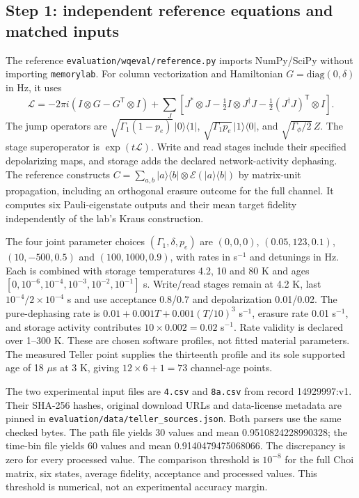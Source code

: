 \documentclass[10pt,a4paper]{article}
\newcommand{\code}[1]{\texttt{#1}}
\begin{document}
\subsection{Step 1: independent reference equations and matched inputs}
The reference \code{evaluation/wqeval/reference.py} imports NumPy/SciPy without importing \code{memorylab}. For column vectorization and Hamiltonian $G=\mathrm{diag}(0,\delta)$ in Hz, it uses
\[
\mathcal L=-2\pi i(I\otimes G-G^{\mathsf T}\otimes I)
+\sum_J\left[J^*\otimes J-\tfrac12 I\otimes J^\dagger J
-\tfrac12(J^\dagger J)^{\mathsf T}\otimes I\right].
\]
The jump operators are $\sqrt{\Gamma_1(1-p_e)}\,|0\rangle\langle1|$, $\sqrt{\Gamma_1p_e}\,|1\rangle\langle0|$, and $\sqrt{\Gamma_\phi/2}\,Z$. The stage superoperator is $\exp(t\mathcal L)$. Write and read stages include their specified depolarizing maps, and storage adds the declared network-activity dephasing. The reference constructs $C=\sum_{a,b}|a\rangle\langle b|\otimes\mathcal E(|a\rangle\langle b|)$ by matrix-unit propagation, including an orthogonal erasure outcome for the full channel. It computes six Pauli-eigenstate outputs and their mean target fidelity independently of the lab's Kraus construction.

The four joint parameter choices $(\Gamma_1,\delta,p_e)$ are $(0,0,0)$, $(0.05,123,0.1)$, $(10,-500,0.5)$ and $(100,1000,0.9)$, with rates in s$^{-1}$ and detunings in Hz. Each is combined with storage temperatures 4.2, 10 and 80 K and ages $[0,10^{-6},10^{-4},10^{-3},10^{-2},10^{-1}]$ s. Write/read stages remain at 4.2 K, last $10^{-4}/2\times10^{-4}$ s and use acceptance 0.8/0.7 and depolarization 0.01/0.02. The pure-dephasing rate is $0.01+0.001T+0.001(T/10)^3$ s$^{-1}$, erasure rate 0.01 s$^{-1}$, and storage activity contributes $10\times0.002=0.02$ s$^{-1}$. Rate validity is declared over 1--300 K. These are chosen software profiles, not fitted material parameters. The measured Teller point supplies the thirteenth profile and its sole supported age of 18 $\mu$s at 3 K, giving $12\times6+1=73$ channel-age points.

The two experimental input files are \code{4.csv} and \code{8a.csv} from record 14929997:v1. Their SHA-256 hashes, original download URLs and data-license metadata are pinned in \code{evaluation/data/teller\_sources.json}. Both parsers use the same checked bytes. The path file yields 30 values and mean 0.9510824228990328; the time-bin file yields 60 values and mean 0.9140479475068066. The discrepancy is zero for every processed value. The comparison threshold is $10^{-8}$ for the full Choi matrix, six states, average fidelity, acceptance and processed values. This threshold is numerical, not an experimental accuracy margin.
\end{document}
